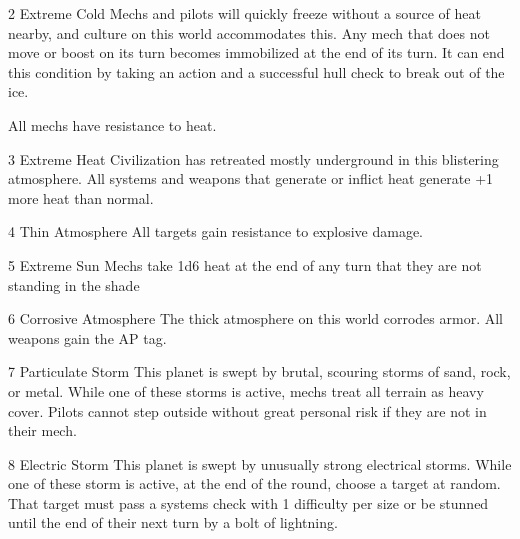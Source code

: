  2       Extreme Cold                        Mechs and pilots will quickly freeze without a source of
                                             heat nearby, and culture on this world accommodates
                                             this. Any mech that does not move or boost on its turn
                                             becomes immobilized at the end of its turn. It can end
                                             this condition by taking an action and a successful hull
                                             check to break out of the ice.

                                             All mechs have resistance to heat.

 3       Extreme Heat                        Civilization has retreated mostly underground in this
                                             blistering atmosphere. All systems and weapons that
                                             generate or inflict heat generate +1 more heat than
                                             normal.

 4       Thin Atmosphere                     All targets gain resistance to explosive damage.




5       Extreme Sun                         Mechs take 1d6 heat at the end of any turn that they
                                            are not standing in the shade

6       Corrosive Atmosphere               The thick atmosphere on this world corrodes armor. All
                                            weapons gain the AP tag.

7       Particulate Storm                  This planet is swept by brutal, scouring storms of sand,
                                            rock, or metal. While one of these storms is active,
                                            mechs treat all terrain as heavy cover. Pilots cannot
                                            step outside without great personal risk if they are not
                                            in their mech.

8       Electric Storm                     This planet is swept by unusually strong electrical
                                            storms. While one of these storm is active, at the end of
                                           the round, choose a target at random. That target must
                                            pass a systems check with 1 difficulty per size or be
                                            stunned until the end of their next turn by a bolt of
                                            lightning.

